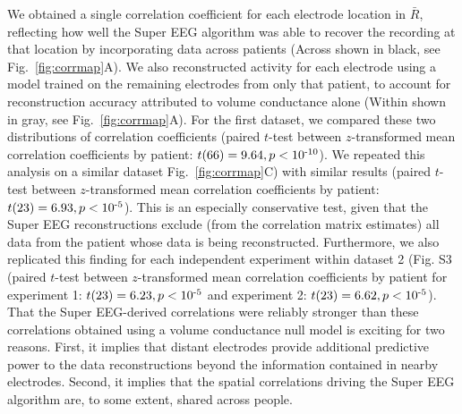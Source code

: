 \documentclass[12pt]{article}
\begin{document}
We obtained a single correlation coefficient for each electrode
location in $\bar{R}$, reflecting how well the Super EEG algorithm was
able to recover the recording at that location by incorporating data across patients (Across shown in black, see Fig.~\ref{fig:corrmap}A). We also reconstructed activity for each electrode using a model trained on the remaining electrodes from only that patient, to account for reconstruction accuracy attributed to volume conductance alone (Within shown in gray, see Fig.~\ref{fig:corrmap}A). For the first dataset, we compared these two distributions of correlation coefficients (paired $t$-test
between $z$-transformed mean correlation coefficients by patient:
$t(66) = 9.64, p < 10\textsuperscript{-10}$).  We repeated this analysis on a similar dataset Fig.~\ref{fig:corrmap}C) with similar results (paired $t$-test
between $z$-transformed mean correlation coefficients by patient: $t(23) = 6.93, p < 10\textsuperscript{-5}$). This is an especially conservative
test, given that the Super EEG reconstructions exclude (from the
correlation matrix estimates) all data from the patient whose data is
being reconstructed.  Furthermore, we also replicated this finding for each independent experiment within dataset 2 (Fig. S3 (paired $t$-test
between $z$-transformed mean correlation coefficients by patient for experiment 1: $t(23) = 6.23, p < 10\textsuperscript{-5}$ and experiment 2: $t(23) = 6.62, p < 10\textsuperscript{-5}$).  That the Super EEG-derived correlations were reliably
stronger than these correlations obtained using a volume conductance null model is exciting
for two reasons.  First, it implies that distant electrodes provide
additional predictive power to the data reconstructions beyond the
information contained in nearby electrodes.  Second, it implies that
the spatial correlations driving the Super EEG algorithm are, to some
extent, shared across people.
\end{document}
